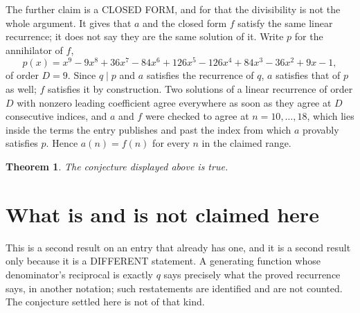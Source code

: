 \documentclass[11pt,a4paper]{article}
\theoremstyle{plain}
\newtheorem{theorem}{Theorem}
\theoremstyle{definition}
\begin{document}
The further claim is a CLOSED FORM, and for that the divisibility is not the whole argument. It
gives that $a$ and the closed form $f$ satisfy the same linear recurrence; it does not say they
are the same solution of it. Write $p$ for the annihilator of $f$,
\[
  p(x)=x^{9} - 9 x^{8} + 36 x^{7} - 84 x^{6} + 126 x^{5} - 126 x^{4} + 84 x^{3} - 36 x^{2} + 9 x - 1 ,
\]
of order $D=9$. Since $q\mid p$ and $a$ satisfies the recurrence of $q$, $a$ satisfies that of
$p$ as well; $f$ satisfies it by construction. Two solutions of a linear recurrence of order $D$
with nonzero leading coefficient agree everywhere as soon as they agree at $D$ consecutive
indices, and $a$ and $f$ were checked to agree at $n=10,\dots,18$,
which lies inside the terms the entry publishes and past the index from which $a$ provably
satisfies $p$. Hence $a(n)=f(n)$ for every $n$ in the claimed range.

\begin{theorem}
The conjecture displayed above is true.
\end{theorem}

\section{What is and is not claimed here}

This is a second result on an entry that already has one, and it is a second result only because
it is a DIFFERENT statement. A generating function whose denominator's reciprocal is exactly $q$
says precisely what the proved recurrence says, in another notation; such restatements are
identified and are not counted. The conjecture settled here is not of that kind.
\end{document}
